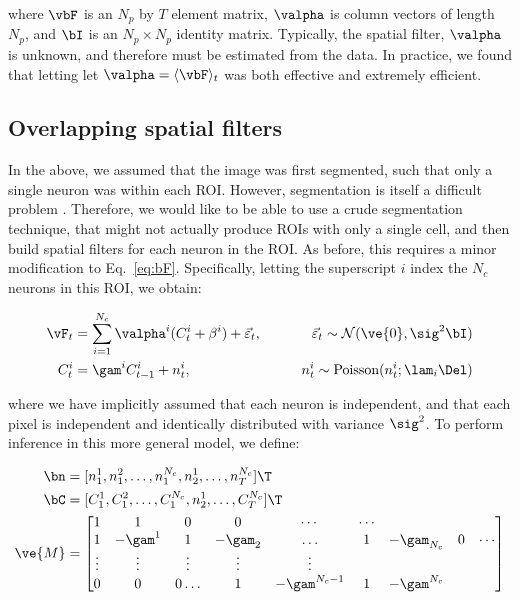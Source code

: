 \noindent where $\vbF$ is an $N_p$ by $T$ element matrix, $\valpha$ is column vectors of length $N_p$, and $\bI$ is an $N_p \times N_p$ identity matrix.  Typically, the spatial filter, $\valpha$ is unknown, and therefore must be estimated from the data.  In practice, we found that letting let $\valpha=\langle \vbF \rangle_t$ was both effective and extremely efficient.




\subsection{Overlapping spatial filters} \label{sec:methods:overlapping}

In the above, we assumed that the image was first segmented, such that only a single neuron was within each ROI.  However, segmentation is itself a difficult problem \cite{}.  Therefore, we would like to be able to use a crude segmentation technique, that might not actually produce ROIs with only a single cell, and then build spatial filters for each neuron in the ROI.  As before, this requires a minor modification to Eq.~\eqref{eq:bF}.  Specifically, letting the superscript $i$ index the $N_c$ neurons in this ROI, we obtain:  

\begin{align}
\vF_t &= \sum_{i=1}^{N_c}\valpha^i (C^i_t + \beta^i) +  \vec{\varepsilon}_t, \qquad &\vec{\varepsilon}_t \sim \mathcal{N}(\ve{0},\sig^2 \bI)   \\
C^i_t &= \gam^i C^i_{t-1} + n^i_t, & n^i_t \sim \text{Poisson}(n^i_t; \lam_i \Del)
\end{align}

\noindent where we have implicitly assumed that each neuron is independent, and that each pixel is independent and identically distributed with variance $\sig^2$.  To perform inference in this more general model, we define:

\begin{align} \label{eq:M2}
\bn &=  [n^1_1, n^2_1, \ldots, n^{N_c}_1, n^1_2, \ldots, n^{N_c}_T]\T \\
\bC &=  [C^1_1, C^2_1, \ldots, C^{N_c}_1, n^1_2, \ldots, C^{N_c}_T]\T \\
\ve{M} &= %
\begin{bmatrix}
1 & 1 & 0 & 0 & \cdots & \cdots \\
1 & -\gam^1 & 1 & -\gam_2 & \ldots & 1 & -\gam_{N_c}  & 0 & \cdots \\
\vdots & \vdots & \vdots & \vdots & \vdots  \\
0 & 0 & 0 \ldots & 1 & -\gam^{N_c-1} & 1 & -\gam^{N_c}
\end{bmatrix}
\end{align} 


